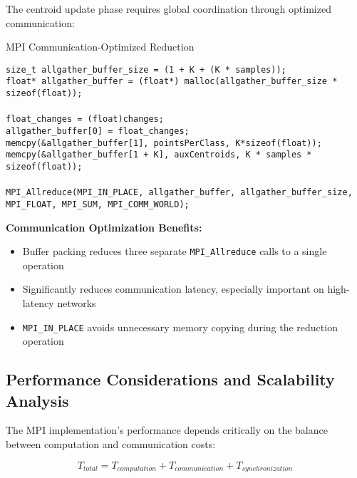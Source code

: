 \documentclass[12pt,a4paper]{article}
\begin{document}
The centroid update phase requires global coordination through optimized communication:

\begin{algorithm}[H]
\caption{MPI Communication-Optimized Reduction}
\label{alg:mpi_reduction}
\begin{flushleft}
\texttt{size\_t allgather\_buffer\_size = (1 + K + (K * samples));}\\
\texttt{float* allgather\_buffer = (float*) malloc(allgather\_buffer\_size * sizeof(float));}\\
\\
\texttt{float\_changes = (float)changes;}\\
\texttt{allgather\_buffer[0] = float\_changes;}\\
\texttt{memcpy(\&allgather\_buffer[1], pointsPerClass, K*sizeof(float));}\\
\texttt{memcpy(\&allgather\_buffer[1 + K], auxCentroids, K * samples * sizeof(float));}\\
\\
\texttt{MPI\_Allreduce(MPI\_IN\_PLACE, allgather\_buffer, allgather\_buffer\_size,}\\
\hspace{6cm}\texttt{MPI\_FLOAT, MPI\_SUM, MPI\_COMM\_WORLD);}
\end{flushleft}
\end{algorithm}

\textbf{Communication Optimization Benefits:}
\begin{itemize}
\item Buffer packing reduces three separate \texttt{MPI\_Allreduce} calls to a single operation
\item Significantly reduces communication latency, especially important on high-latency networks
\item \texttt{MPI\_IN\_PLACE} avoids unnecessary memory copying during the reduction operation
\end{itemize}

\subsection{Performance Considerations and Scalability Analysis}

The MPI implementation's performance depends critically on the balance between computation and communication costs:

\begin{equation}
T_{total} = T_{computation} + T_{communication} + T_{synchronization}
\end{equation}
\end{document}
